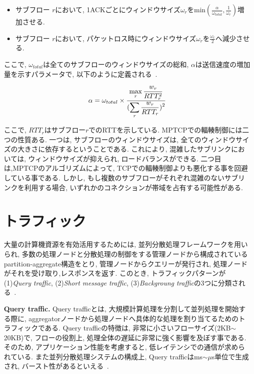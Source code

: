 \begin{itemize}
\item サブフロー $r$において,
1ACKごとにウィンドウサイズ$\omega_{r}$をmin$(\frac{\alpha}{\omega_{total}},
\frac{1}{\omega_r})$増加させる.
\item サブフロー $r$において, パケットロス時にウィンドウサイズ$\omega_r$を$\frac{\omega_r}{2}$へ減少させる.
\end{itemize}
ここで, $\omega_{total}$は全てのサブフローのウィンドウサイズの総和, $\alpha$は送信速度の増加量を示すパラメータで,
以下のように定義される~\cite{cong}.

\vspace{-2mm}
\begin{eqnarray}
 \alpha = \omega_{total} \times
\frac{\displaystyle \max_{r} \frac{w_r}{RTT^2_r}}{\displaystyle
(\sum_{r}\frac{w_r}{RTT_r})^2}
\label{alpha}
\vspace{-2mm}
\end{eqnarray}

ここで, $RTT_r$はサブフロー$r$でのRTTを示している.
MPTCPでの輻輳制御には二つの性質ある.
一つは, サブフローのウィンドウサイズは, 全てのウィンドウサイズの大きさに依存するということである.
これにより, 混雑したサブリンクにおいては, ウィンドウサイズが抑えられ, ロードバランスができる.
二つ目は,MPTCPのアルゴリズムによって, TCPでの輻輳制御よりも悪化する事を回避している事である.
しかし, もし複数のサブフローがそれぞれ混雑のないサブリンクを利用する場合, いずれかのコネクションが帯域を占有する可能性がある.


\section{トラフィック}
\label{sec:traffic}

大量の計算機資源を有効活用するためには,
並列分散処理フレームワークを用いられ, 多数の処理ノードと分散処理の制御をする管理ノードから構成されているpartition-aggregate構造をとり,
管理ノードからクエリーが発行され, 処理ノードがそれを受け取り,レスポンスを返す.
このとき, トラフィックパターンが  (1){\it Query traffic}, (2){\it Short message
traffic}, (3){\it Backgroung traffic}の3つに分類される~\cite{dctcp}.

{\bf Query traffic. }Query trafficとは, 大規模計算処理を分割して並列処理を開始する際に,
aggregatorノードから処理ノードへ具体的な処理を割り当てるためのトラフィックである.
Query trafficの特徴は, 非常に小さいフローサイズ(2KB$\sim$20KB)で,
フローの役割上, 処理全体の遅延に非常に強く影響を及ぼす事である.
そのため, アプリケーション性能を考慮すると, 低レイテンシでの通信が求められている.
また並列分散処理システムの構成上, Query trafficはms$\sim \mu$s単位で生成され,
バースト性があるといえる~\cite{dctcp}.


